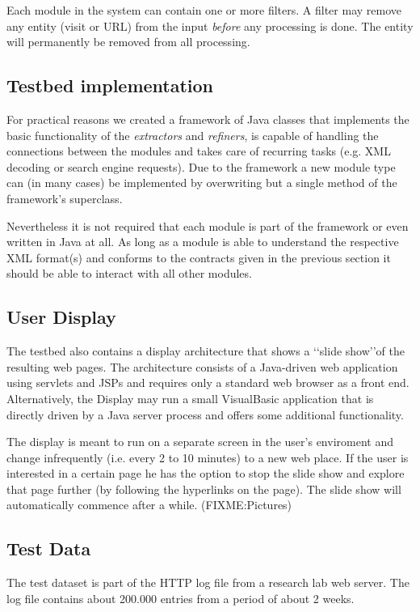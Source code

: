 \documentclass[a4paper]{danarticle}
\begin{document}
      Each module in the system can contain one or more filters. A filter may 
      remove any entity (visit or URL) from the input \textit{before} any 
      processing is done. The entity will permanently be removed from all 
      processing.
    \subsection{Testbed implementation}
      For practical reasons we created a framework of Java classes that 
      implements the basic functionality of the \textit{extractors} and 
      \textit{refiners}, is capable of handling the connections between the 
      modules and takes care of recurring tasks (e.g. XML decoding or search 
      engine requests). Due to the framework a new module type can (in many 
      cases) be implemented by overwriting but a single method of the 
      framework's superclass.
      
      Nevertheless it is not required that each module is part of the 
      framework or even written in Java at all. As long as a module is able to 
      understand the respective XML format(s) and conforms to the contracts 
      given in the previous section it should be able to interact with all 
      other modules.
    \subsection{User Display}
      The testbed also contains a display architecture that shows a \lq\lq slide
      show\rq\rq of the resulting web pages. The architecture consists of a
      Java-driven web application using servlets and JSPs and requires only a
      standard web browser as a front end. Alternatively, the Display may run a
      small VisualBasic application that is directly driven by a Java server
      process and offers some additional functionality.
      
      The display is meant to run on a separate screen in the user's enviroment
      and change infrequently (i.e. every 2 to 10 minutes) to a new web place.
      If the user is interested in a certain page he has the option to stop the
      slide show and explore that page further (by following the hyperlinks on
      the page). The slide show will automatically commence after a while.
      (FIXME:Pictures)
    \subsection{Test Data}
      The test dataset is part of the HTTP log file from a research lab
      web server. The log file contains about 200.000 entries from a period of
      about 2 weeks.
      
\end{document}
